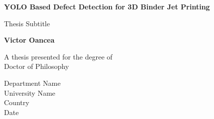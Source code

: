 \begin{titlepage}
   \begin{center}
       \vspace*{1cm}

       \textbf{YOLO Based Defect Detection for 3D Binder Jet Printing}

       \vspace{0.5cm}
        Thesis Subtitle

       \vspace{1.5cm}

       \textbf{Victor Oancea}

       \vfill

       A thesis presented for the degree of\\
       Doctor of Philosophy

       \vspace{0.8cm}


       Department Name\\
       University Name\\
       Country\\
       Date

   \end{center}
\end{titlepage}
